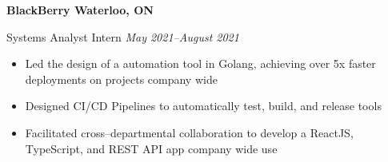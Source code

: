 \textbf{BlackBerry \hfill Waterloo, ON}

Systems Analyst Intern \hfill \textit{May 2021--August 2021}
\begin{itemize}
    \item Led the design of a automation tool in Golang, achieving over 5x faster deployments on projects company wide
    \item Designed CI\slash CD Pipelines to automatically test, build, and release tools
    \item Facilitated cross--departmental collaboration to develop a ReactJS, TypeScript, and REST API app company wide use
\end{itemize}
